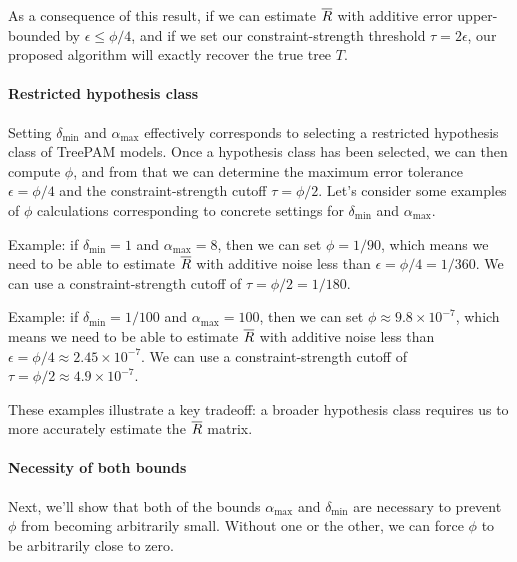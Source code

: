 \documentclass{article}
\theoremstyle{definition}
\newcommand{\deltaMin}{\delta_{\text{min}}}
\newcommand{\alphaMax}{\alpha_{\text{max}}}
\begin{document}
As a consequence of this result, if we can estimate $\overline{R}$ with additive error upper-bounded by $\epsilon \leq \phi/4$, and if we set our constraint-strength threshold $\tau = 2\epsilon$, our proposed algorithm will exactly recover the true tree $T$.


\paragraph{Restricted hypothesis class}
Setting $\deltaMin$ and $\alphaMax$ effectively corresponds to selecting a restricted hypothesis class of TreePAM models.
Once a hypothesis class has been selected, we can then compute $\phi$, and from that we can determine the maximum error tolerance $\epsilon = \phi/4$ and the constraint-strength cutoff $\tau = \phi/2$.
Let's consider some examples of $\phi$ calculations corresponding to concrete settings for $\deltaMin$ and $\alphaMax$.

Example: if $\deltaMin = 1$ and $\alphaMax = 8$, then we can set $\phi = 1/90$, which means we need to be able to estimate $\overline{R}$ with additive noise less than $\epsilon = \phi/4 = 1/360$.
We can use a constraint-strength cutoff of $\tau = \phi/2 = 1/180$.

Example: if $\deltaMin = 1/100$ and $\alphaMax = 100$, then we can set $\phi \approx 9.8 \times 10^{-7}$, which means we need to be able to estimate $\overline{R}$ with additive noise less than $\epsilon = \phi/4 \approx 2.45 \times 10^{-7}$.
We can use a constraint-strength cutoff of $\tau = \phi/2 \approx 4.9 \times 10^{-7}$.

These examples illustrate a key tradeoff: a broader hypothesis class requires us to more accurately estimate the $\overline{R}$ matrix.


\paragraph{Necessity of both bounds}
Next, we'll show that both of the bounds $\alphaMax$ and $\deltaMin$ are necessary to prevent $\phi$ from becoming arbitrarily small.
Without one or the other, we can force $\phi$ to be arbitrarily close to zero.
\end{document}

